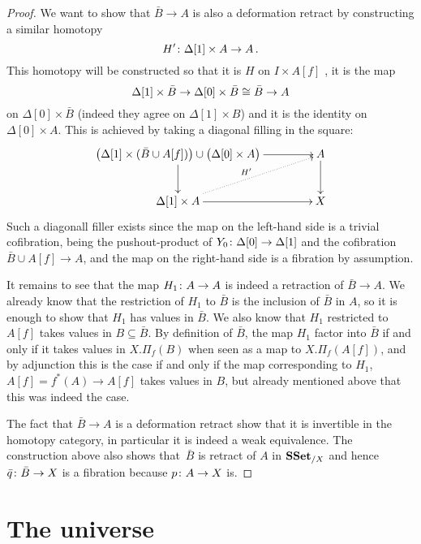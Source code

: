 \documentclass[reqno,10pt,a4paper,oneside,draft]{amsart}
\begin{document}
\begin{proof}
We want to show that $\bar{B} \rightarrow A$ is also a deformation retract by constructing a similar homotopy 
\[
H' \colon \Delta[1] \times A \rightarrow A \, .
\] 
This homotopy will be constructed so that it is $H$ on $I \times A[f]$ ,  it is the map 
\[
\Delta[1] \times \bar{B} \rightarrow \Delta[0]  \times \bar{B} \cong \bar{B} \rightarrow A
\] 
on $\Delta[0] \times \bar{B} $ (indeed they agree on $\Delta[1] \times B$) and it is the identity on $\Delta[0] \times A$.  This is achieved by taking a diagonal filling in the square:
\[
\xymatrix@C=1.5cm{
\big( \Delta[1] \times (\bar{B} \cup A[f]) \big)  \cup \big( \Delta[0] \times A \big) \ar[d] \ar[r] & A \ar[d] \\
\Delta[1] \times A \ar[r] \ar@{.>}[ur]^{H'} & X
}\]
Such a diagonall filler exists since the map on the left-hand side is a trivial cofibration, being the 
 pushout-product of $Y_0 \colon \Delta[0] \rightarrow \Delta[1]$ and the cofibration $\bar{B} \cup A[f] \rightarrow A$, and the map on the right-hand side is a fibration by assumption.

It remains to see that the map $H_{1} \colon A \rightarrow A$ is indeed a retraction of $\bar{B} \rightarrow A$. We already know that the restriction of $H_{1}$ to $\bar{B}$ is  the inclusion of $\bar{B}$ in $A$, so it is enough to show that $H_{1}$ has values in $\bar{B}$. We also know that $H_{1}$ restricted to $A[f]$ takes values in $B \subseteq \bar{B}$. By definition of $\bar{B}$, the map $H_1$ factor into $\bar{B}$ if and only if it takes values in $X.\Pi_f(B)$ when seen as a map to $X.\Pi_f(A[f])$, and by adjunction this is the case if and only if the map corresponding to $H_1$, $A[f]= f^*(A) \rightarrow A[f]$ takes values in $B$, but already mentioned above that this was indeed the case.

The fact that $\bar{B} \rightarrow A$ is a deformation retract show that it is invertible in the homotopy category, in particular it is indeed a weak equivalence. The construction above also shows that~$\bar{B}$ is retract of $A$ in $\mathbf{SSet}_{/X}$ and hence $\bar{q} \colon \bar{B} \rightarrow X$ is a fibration because $p \colon A \rightarrow X$ is.
\end{proof}

\newpage

\section{The universe}
\end{document}
